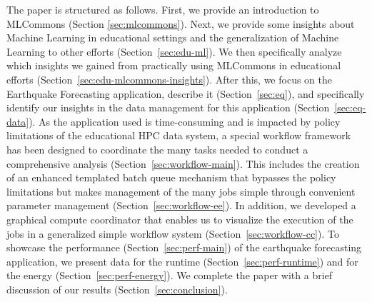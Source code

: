 The paper is structured as follows. First, we provide an introduction to MLCommons (Section \ref{sec:mlcommons}).  Next, we provide some insights about Machine Learning in educational settings and the generalization of Machine Learning to other efforts (Section~\ref{sec:edu-ml}). We then specifically analyze which insights we gained from practically using MLCommons in educational efforts (Section~\ref{sec:edu-mlcommons-insights}). After this, we focus on the Earthquake Forecasting application, describe it (Section~\ref{sec:eq}), and specifically identify our insights in the data management for this application (Section~\ref{sec:eq-data}).  As the application used is time-consuming and is impacted by policy limitations of the educational HPC data system, a special workflow framework has been designed to coordinate the many tasks needed to conduct a comprehensive analysis (Section~\ref{sec:workflow-main}). This includes the creation of an enhanced templated batch queue mechanism that bypasses the policy limitations but makes management of the many jobs simple through convenient parameter management (Section~\ref{sec:workflow-ee}). In addition, we developed a graphical compute coordinator that enables us to visualize the execution of the jobs in a generalized simple workflow system (Section~\ref{sec:workflow-cc}).  To showcase the performance (Section~\ref{sec:perf-main}) of the earthquake forecasting application, we present data for the runtime (Section~\ref{sec:perf-runtime}) and for the energy (Section~\ref{sec:perf-energy}). We complete the paper with a brief discussion of our results (Section~\ref{sec:conclusion}).

